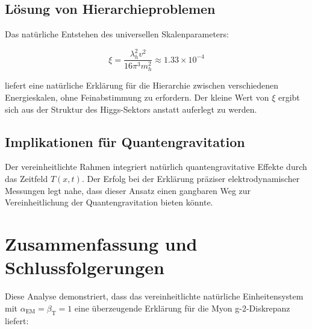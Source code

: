 \documentclass[12pt,a4paper]{article}
\newcommand{\Tfieldt}{T(x,t)}
\newcommand{\alphaEM}{\alpha_{\text{EM}}}
\newcommand{\betaT}{\beta_{\text{T}}}
\newcommand{\xipar}{\xi}
\begin{document}
	\subsection{Lösung von Hierarchieproblemen}
	\label{subsec:hierarchy_resolution}
	
	Das natürliche Entstehen des universellen Skalenparameters:
	
	\begin{equation}
		\xipar = \frac{\lambda_h^2 v^2}{16\pi^3 m_h^2} \approx 1.33 \times 10^{-4}
	\end{equation}
	
	liefert eine natürliche Erklärung für die Hierarchie zwischen verschiedenen Energieskalen, ohne Feinabstimmung zu erfordern. Der kleine Wert von $\xipar$ ergibt sich aus der Struktur des Higgs-Sektors anstatt auferlegt zu werden.
	
	\subsection{Implikationen für Quantengravitation}
	\label{subsec:quantum_gravity}
	
	Der vereinheitlichte Rahmen integriert natürlich quantengravitative Effekte durch das Zeitfeld $\Tfieldt$. Der Erfolg bei der Erklärung präziser elektrodynamischer Messungen legt nahe, dass dieser Ansatz einen gangbaren Weg zur Vereinheitlichung der Quantengravitation bieten könnte.
	
	\section{Zusammenfassung und Schlussfolgerungen}
	
	Diese Analyse demonstriert, dass das vereinheitlichte natürliche Einheitensystem mit $\alphaEM = \betaT = 1$ eine überzeugende Erklärung für die Myon g-2-Diskrepanz liefert:
	
\end{document}
